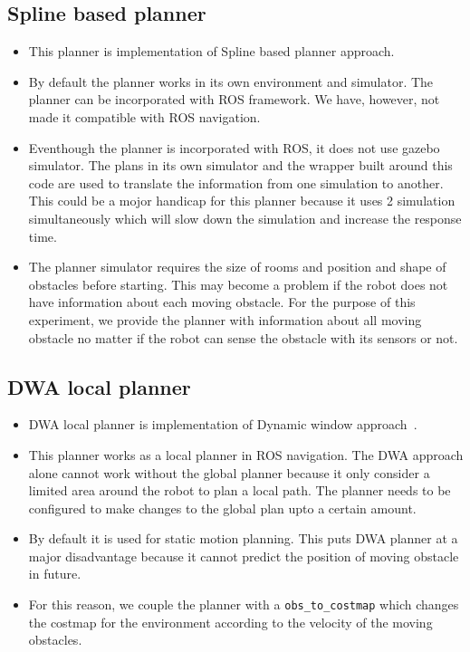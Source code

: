 \subsection{Spline based planner}%
\label{sub:spline_based_planner}
\begin{itemize}
    \item This planner\cite{omgtools} is implementation of Spline based planner approach\cite{mercy2017spline}.
    \item By default the planner works in its own environment and simulator. The planner can be 
        incorporated with ROS framework\cite{p3dxMotionplanner}. We have, however, not made it 
        compatible with ROS navigation.
    \item Eventhough the planner is incorporated with ROS, it does not use gazebo simulator. The 
        plans in its own simulator and the wrapper built around this code are used to translate the 
        information from one simulation to another. This could be a mojor handicap for this planner 
        because it uses 2 simulation simultaneously which will slow down the simulation and increase
        the response time.
    \item The planner simulator requires the size of rooms and position and shape of obstacles before
        starting. This may become a problem if the robot does not have information about each moving
        obstacle. For the purpose of this experiment, we provide the planner with information about
        all moving obstacle no matter if the robot can sense the obstacle with its sensors or not.
\end{itemize}

\subsection{DWA local planner}%
\label{sub:dynamic_window_approach_planner}
\begin{itemize}
    \item DWA local planner\cite{dwa} is implementation of Dynamic window approach~\cite{fox1997dynamic}.
    \item This planner works as a local planner in ROS navigation\cite{rosnavigation}. The DWA approach
        alone cannot work without the global planner because it only consider a limited area around
        the robot to plan a local path. The planner needs to be configured to make changes to the
        global plan upto a certain amount.
    \item By default it is used for static motion planning. This puts DWA planner at a major disadvantage
        because it cannot predict the position of moving obstacle in future. 
    \item For this reason, we couple the planner with a \texttt{obs\_to\_costmap} which changes the costmap for the 
        environment according to the velocity of the moving obstacles.
\end{itemize}

